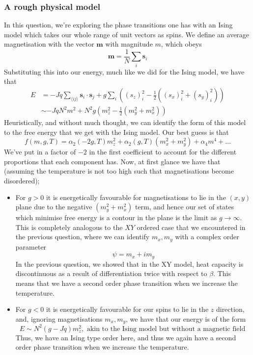 \documentclass[11pt, oneside]{article}   	%
\begin{document}
\subsubsection*{A rough physical model} 
In this question, we're exploring the phase transitions one has with an Ising model which takes our whole range of unit vectors as spins. We define an average magnetisation with the vector $\mathbf{m} $ with magnitude $m$, which obeys 
\[ 
	\mathbf{ m }  = \frac{ 1}{N} \sum_i \mathbf{s}_i
\] Substituting this into our energy, much like we did for the Ising model, we have that 
\begin{align*} 
	E &= - Jq \sum_{ \langle ij \rangle} \mathbf{s}_i \cdot \mathbf{s}_j + g \sum_i \left( ( s_z )^2_i - \frac{ 1}{2} ( (s_x)^2_i + ( s_y)^2_i )  \right) \\
	& \sim - JqN^2m^2 + N^2  g \left( m_z^2 - \frac{1}{2} ( m_y^2 + m_x^2 ) \right) 
\end{align*} 
Heuristically, and without much thought, we can identify the form of this model to the free energy that we get with the Ising model. Our best guess is that 
\[ 
	f(m, g, T) = \alpha_2 (  - 2g, T ) m_z^2  + \alpha_2( g, T) (m_x^2 + m_y^2 ) + \alpha_4 m^4 + \dots 
\] 
We've put in a factor of $ - 2$ in the first coefficient to account for the different proportions that each component has. Now, at first glance we have that (assuming the temperature is not too high such that magnetisations become disordered); 
\begin{itemize} 
	\item For $g > 0$ it is energetically favourable for magnetisations to lie in the $( x, y)$ plane due to the negative $ ( m_y^2 + m_x^2 )$ term, and hence our set of states which minimise free energy is a contour in the plane is the limit as $g \rightarrow \infty$. This is completely analogous to the $XY$ ordered case that we encountered in the previous question, where we can identify $m_x, m_y$ with a complex order parameter 
	\[ 
		\psi = m_x + i m_y 
	\] In the previous question, we showed that in the XY model, heat capacity is discontinuous as a result of differentiation twice with respect to $\beta$. This means that we have a second order phase transition when we increase the temperature. 
	\item For $g  < 0$ it is energetically favourable for our spins to lie in the $z$ direction, and, ignoring magnetisations $m_x, m_y$, we have that our energy is of the form 
	\[ E \sim   N^2 ( g - Jq)m_z^2, \text{ akin to the Ising model but without a magnetic field } \] Thus, we have an Ising type order here, and thus we again have a second order phase transition when we increase the temperature. 
\end{itemize} 
\end{document}
